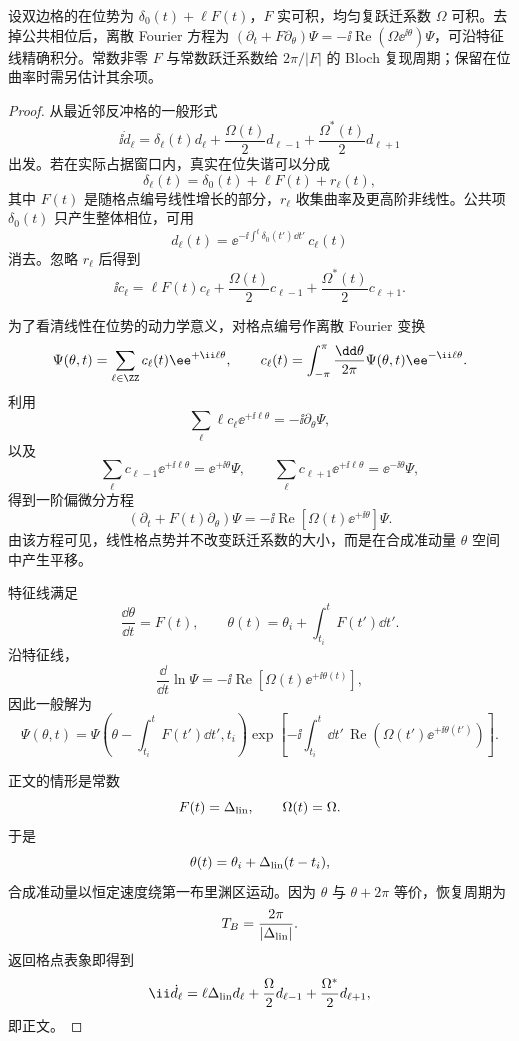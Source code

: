\begin{proposition}
设双边格的在位势为 $\delta_0(t)+\ell F(t)$，$F$ 实可积，均匀复跃迁系数 $\Omega$ 可积。去掉公共相位后，离散 Fourier 方程为 $(\partial_t+F\partial_\theta)\Psi=-\ii\operatorname{Re}(\Omega \ee^{\ii\theta})\Psi$，可沿特征线精确积分。常数非零 $F$ 与常数跃迁系数给 $2\pi/|F|$ 的 Bloch 复现周期；保留在位曲率时需另估计其余项。
\end{proposition}
\begin{proof}
从最近邻反冲格的一般形式
\[
\ii\dot d_\ell
=
\delta_\ell(t)d_\ell
+\frac{\Omega(t)}{2}d_{\ell-1}
+\frac{\Omega^*(t)}{2}d_{\ell+1}
\]
出发。若在实际占据窗口内，真实在位失谐可以分成
\[
\delta_\ell(t)
=
\delta_0(t)+\ell F(t)+r_\ell(t),
\]
其中 $F(t)$ 是随格点编号线性增长的部分，$r_\ell$ 收集曲率及更高阶非线性。公共项 $\delta_0(t)$ 只产生整体相位，可用
\[
d_\ell(t)
=
\ee^{-\ii\int^t\delta_0(t')\dd t'}\,c_\ell(t)
\]
消去。忽略 $r_\ell$ 后得到
\[
\ii\dot c_\ell
=
\ell F(t)c_\ell
+\frac{\Omega(t)}2c_{\ell-1}
+\frac{\Omega^*(t)}2c_{\ell+1}.
\]

为了看清线性在位势的动力学意义，对格点编号作离散 Fourier 变换
\[
\Psi(\theta,t)
=
\sum_{\ell\in\ZZ}
c_\ell(t)\ee^{+\ii\ell\theta},
\qquad
c_\ell(t)
=
\int_{-\pi}^{\pi}\frac{\dd\theta}{2\pi}
\Psi(\theta,t)\ee^{-\ii\ell\theta}.
\]
利用
\[
\sum_\ell \ell c_\ell\ee^{+\ii\ell\theta}
=
-\ii\partial_\theta\Psi,
\]
以及
\[
\sum_\ell c_{\ell-1}\ee^{+\ii\ell\theta}
=
\ee^{+\ii\theta}\Psi,
\qquad
\sum_\ell c_{\ell+1}\ee^{+\ii\ell\theta}
=
\ee^{-\ii\theta}\Psi,
\]
得到一阶偏微分方程
\[
\left(
\partial_t+F(t)\partial_\theta
\right)\Psi
=
-\ii
\operatorname{Re}
\!\left[
\Omega(t)\ee^{+\ii\theta}
\right]\Psi.
\]
由该方程可见，线性格点势并不改变跃迁系数的大小，而是在合成准动量 $\theta$ 空间中产生平移。

特征线满足
\[
\frac{\dd\theta}{\dd t}
=
F(t),
\qquad
\theta(t)
=
\theta_i+\int_{t_i}^{t}F(t')\dd t'.
\]
沿特征线，
\[
\frac{\dd}{\dd t}
\ln\Psi
=
-\ii
\operatorname{Re}
\!\left[
\Omega(t)\ee^{+\ii\theta(t)}
\right],
\]
因此一般解为
\[
\Psi(\theta,t)
=
\Psi\!\left(
\theta-\int_{t_i}^{t}F(t')\dd t',
t_i
\right)
\exp\!\left[
-\ii
\int_{t_i}^{t}\dd t'\,
\operatorname{Re}
\!\left(
\Omega(t')\ee^{+\ii\theta(t')}
\right)
\right].
\]

正文的情形是常数
\[
F(t)=\Delta_{\rm lin},
\qquad
\Omega(t)=\Omega.
\]
于是
\[
\theta(t)
=
\theta_i+\Delta_{\rm lin}(t-t_i),
\]
合成准动量以恒定速度绕第一布里渊区运动。因为 $\theta$ 与 $\theta+2\pi$ 等价，恢复周期为
\[
T_B
=
\frac{2\pi}{|\Delta_{\rm lin}|}.
\]
返回格点表象即得到
\[
{
\ii\dot d_\ell
=
\ell\Delta_{\rm lin}d_\ell
+\frac{\Omega}{2}d_{\ell-1}
+\frac{\Omega^*}{2}d_{\ell+1},
}
\]
即正文。
\end{proof}


